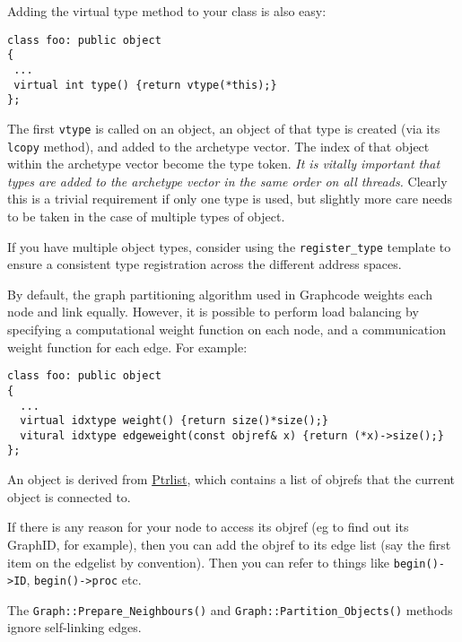 Adding the virtual type method to your class is also easy:



\begin{verbatim}
class foo: public object
{
 ...
 virtual int type() {return vtype(*this);}
};
\end{verbatim}

The first \verb+vtype+ is called on an object, an object
of that type is created (via its \verb+lcopy+ method), and added to
the archetype vector. The index of that object within
the archetype vector become the type token. {\em It is vitally
  important that types are added to the archetype vector in the same
  order on all threads.} Clearly this is a trivial requirement if only
one type is used, but slightly more care needs to be taken in the case
of multiple types of object.

If you have multiple object types, consider using the
\verb+register_type+ template to ensure a consistent type registration
across the different address spaces.


By default, the graph partitioning algorithm used in Graphcode weights
each node and link equally. However, it is possible to perform load
balancing by specifying a computational weight function on each node,
and a communication weight function for each edge. For example:
\begin{verbatim}
class foo: public object
{
  ...
  virtual idxtype weight() {return size()*size();}
  vitural idxtype edgeweight(const objref& x) {return (*x)->size();}
};
\end{verbatim}


An object is derived from \hyperref{Ptrlist}{
  (\S}{)}{Ptrlist}, which contains a list of objrefs
that the current object is connected to.


If there is any reason for your node to access its objref (eg to find
out its GraphID, for example), then you can add the objref to its edge
list (say the first item on the edgelist by convention). Then you can
refer to things like \verb+begin()->ID+, \verb+begin()->proc+ etc.

The \verb+Graph::Prepare_Neighbours()+ and
\verb+Graph::Partition_Objects()+ methods ignore self-linking edges.

